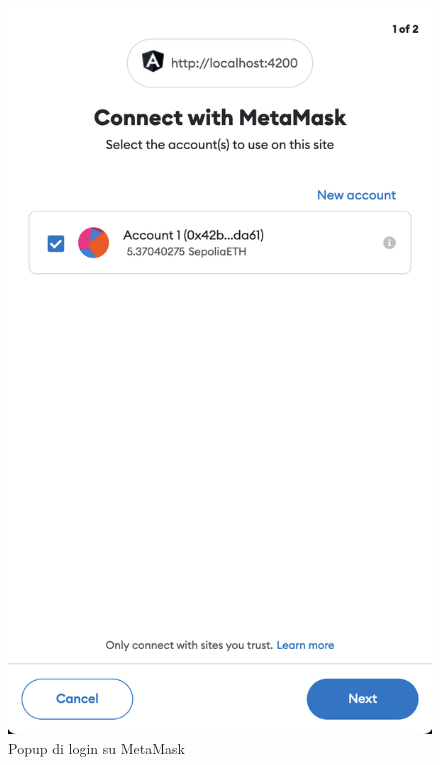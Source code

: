 \begin{figure}[H]
      \includegraphics[width=\linewidth]{src/img/login_metamask.png}
      \caption{Popup di login su MetaMask}\label{fig:login_metamask}
    \endminipage\hfill

\end{figure}
